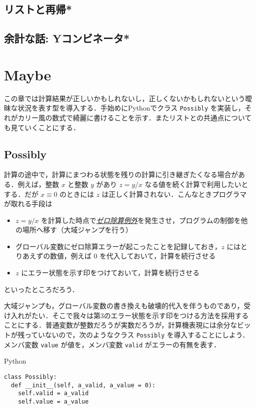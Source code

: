 \documentclass[a4paper,draft]{jsbook}
\newcommand{\programminglanguage}[1]{\textsf{#1}}
\newcommand{\python}{\programminglanguage{Python}}
\newenvironment{leader}{\begingroup}{\endgroup}
\newcommand{\keyword}[1]{{\underline{\emph{#1}}}}
\newcommand{\code}[1]{\texttt{#1}}
\newenvironment{pythoncode}{\begin{itembox}[r]{\python}}{\end{itembox}}
\begin{document}
\section{リストと再帰*}

\section{余計な話: Yコンビネータ*}


\chapter{Maybe}

\begin{leader}
この章では計算結果が正しいかもしれないし，正しくないかもしれないという曖昧な状況を表す型を導入する．手始めに\python でクラス \code{Possibly} を実装し，それがカリー風の数式で綺麗に書けることを示す．またリストとの共通点についても見ていくことにする．
\end{leader}

\section{Possibly}

計算の途中で，計算にまつわる状態を残りの計算に引き継ぎたくなる場合がある．例えば，整数 $x$ と整数 $y$ があり $z=y/x$ なる値を続く計算で利用したいとする．だが $x\equiv0$ のときには $z$ は正しく計算されない．こんなときプログラマが取れる手段は
\begin{itemize}
\item $z=y/x$ を計算した時点で\keyword{ゼロ除算例外}を発生させ，プログラムの制御を他の場所へ移す（大域ジャンプを行う）
\item グローバル変数にゼロ除算エラーが起こったことを記録しておき，$z$ にはとりあえずの数値，例えば $0$ を代入しておいて，計算を続行させる
\item $z$ にエラー状態を示す印をつけておいて，計算を続行させる
\end{itemize}
といったところだろう．

大域ジャンプも，グローバル変数の書き換えも破壊的代入を伴うものであり，受け入れがたい．そこで我々は第3のエラー状態を示す印をつける方法を採用することにする．普通変数が整数だろうが実数だろうが，計算機表現には余分なビットが残っていないので，次のようなクラス \code{Possibly} を導入することにしよう．メンバ変数 \code{value} が値を，メンバ変数 \code{valid} がエラーの有無を表す．
\begin{pythoncode}
\begin{verbatim}
class Possibly:
  def __init__(self, a_valid, a_value = 0):
    self.valid = a_valid
    self.value = a_value
\end{verbatim}
\end{pythoncode}
\end{document}
